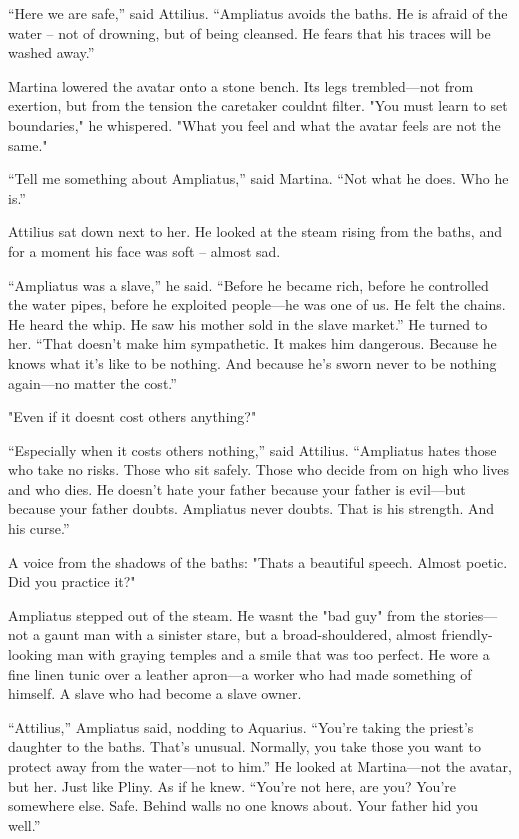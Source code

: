 \documentclass[
]{article}
\begin{document}
``Here we are safe,'' said Attilius. ``Ampliatus avoids the baths. He is afraid of the water -- not of drowning, but of being cleansed. He fears that his traces will be washed away.''

Martina lowered the avatar onto a stone bench. Its legs trembled---not from exertion, but from the tension the caretaker couldn\textquotesingle t filter. "You must learn to set boundaries," he whispered. "What you feel and what the avatar feels are not the same."

``Tell me something about Ampliatus,'' said Martina. ``Not what he does. Who he is.''

Attilius sat down next to her. He looked at the steam rising from the baths, and for a moment his face was soft -- almost sad.

``Ampliatus was a slave,'' he said. ``Before he became rich, before he controlled the water pipes, before he exploited people---he was one of us. He felt the chains. He heard the whip. He saw his mother sold in the slave market.'' He turned to her. ``That doesn't make him sympathetic. It makes him dangerous. Because he knows what it's like to be nothing. And because he's sworn never to be nothing again---no matter the cost.''

"Even if it doesn\textquotesingle t cost others anything?"

``Especially when it costs others nothing,'' said Attilius. ``Ampliatus hates those who take no risks. Those who sit safely. Those who decide from on high who lives and who dies. He doesn't hate your father because your father is evil---but because your father doubts. Ampliatus never doubts. That is his strength. And his curse.''

A voice from the shadows of the baths: "That\textquotesingle s a beautiful speech. Almost poetic. Did you practice it?"

Ampliatus stepped out of the steam. He wasn\textquotesingle t the "bad guy" from the stories---not a gaunt man with a sinister stare, but a broad-shouldered, almost friendly-looking man with graying temples and a smile that was too perfect. He wore a fine linen tunic over a leather apron---a worker who had made something of himself. A slave who had become a slave owner.

``Attilius,'' Ampliatus said, nodding to Aquarius. ``You're taking the priest's daughter to the baths. That's unusual. Normally, you take those you want to protect away from the water---not to him.'' He looked at Martina---not the avatar, but her. Just like Pliny. As if he knew. ``You're not here, are you? You're somewhere else. Safe. Behind walls no one knows about. Your father hid you well.''
\end{document}
